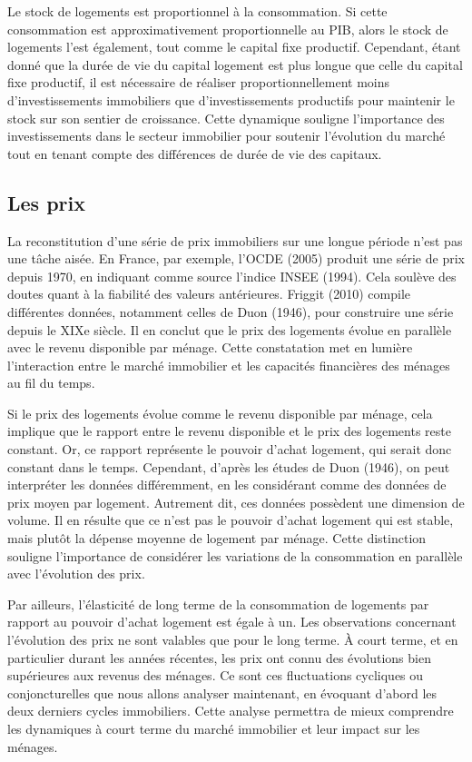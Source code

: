 \documentclass[a4paper, 12pt]{report}
\begin{document}
Le stock de logements est proportionnel à la consommation. Si cette consommation est approximativement proportionnelle au PIB, alors le stock de logements l'est également, tout comme le capital fixe productif. Cependant, étant donné que la durée de vie du capital logement est plus longue que celle du capital fixe productif, il est nécessaire de réaliser proportionnellement moins d'investissements immobiliers que d'investissements productifs pour maintenir le stock sur son sentier de croissance. Cette dynamique souligne l'importance des investissements dans le secteur immobilier pour soutenir l'évolution du marché tout en tenant compte des différences de durée de vie des capitaux.

\subsection{Les prix}

La reconstitution d'une série de prix immobiliers sur une longue période n'est pas une tâche aisée. En France, par exemple, l'OCDE (2005) produit une série de prix depuis 1970, en indiquant comme source l'indice INSEE (1994). Cela soulève des doutes quant à la fiabilité des valeurs antérieures. Friggit (2010) compile différentes données, notamment celles de Duon (1946), pour construire une série depuis le XIXe siècle. Il en conclut que le prix des logements évolue en parallèle avec le revenu disponible par ménage. Cette constatation met en lumière l'interaction entre le marché immobilier et les capacités financières des ménages au fil du temps.

Si le prix des logements évolue comme le revenu disponible par ménage, cela implique que le rapport entre le revenu disponible et le prix des logements reste constant. Or, ce rapport représente le pouvoir d'achat logement, qui serait donc constant dans le temps. Cependant, d'après les études de Duon (1946), on peut interpréter les données différemment, en les considérant comme des données de prix moyen par logement. Autrement dit, ces données possèdent une dimension de volume. Il en résulte que ce n'est pas le pouvoir d'achat logement qui est stable, mais plutôt la dépense moyenne de logement par ménage. Cette distinction souligne l'importance de considérer les variations de la consommation en parallèle avec l'évolution des prix.

Par ailleurs, l'élasticité de long terme de la consommation de logements par rapport au pouvoir d'achat logement est égale à un. Les observations concernant l'évolution des prix ne sont valables que pour le long terme. À court terme, et en particulier durant les années récentes, les prix ont connu des évolutions bien supérieures aux revenus des ménages. Ce sont ces fluctuations cycliques ou conjoncturelles que nous allons analyser maintenant, en évoquant d'abord les deux derniers cycles immobiliers. Cette analyse permettra de mieux comprendre les dynamiques à court terme du marché immobilier et leur impact sur les ménages.
\end{document}

